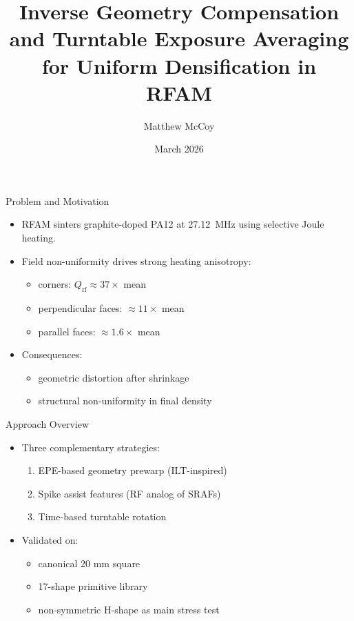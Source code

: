 \documentclass[aspectratio=169,10pt]{beamer}
\title{Inverse Geometry Compensation and Turntable Exposure Averaging for Uniform Densification in RFAM}
\author{Matthew McCoy}
\institute{Georgia Institute of Technology}
\date{March 2026}
\newcommand{\Qrf}{Q_{\mathrm{rf}}}
\begin{document}
\begin{frame}
  \titlepage
\end{frame}

\begin{frame}{Problem and Motivation}
  \begin{itemize}
    \item RFAM sinters graphite-doped PA12 at \SI{27.12}{\mega\hertz} using selective Joule heating.
    \item Field non-uniformity drives strong heating anisotropy:
    \begin{itemize}
      \item corners: $\Qrf \approx 37\times$ mean
      \item perpendicular faces: $\approx 11\times$ mean
      \item parallel faces: $\approx 1.6\times$ mean
    \end{itemize}
    \item Consequences:
    \begin{itemize}
      \item geometric distortion after shrinkage
      \item structural non-uniformity in final density
    \end{itemize}
  \end{itemize}
\end{frame}

\begin{frame}{Approach Overview}
  \begin{itemize}
    \item Three complementary strategies:
    \begin{enumerate}
      \item EPE-based geometry prewarp (ILT-inspired)
      \item Spike assist features (RF analog of SRAFs)
      \item Time-based turntable rotation
    \end{enumerate}
    \item Validated on:
    \begin{itemize}
      \item canonical 20 mm square
      \item 17-shape primitive library
      \item non-symmetric H-shape as main stress test
    \end{itemize}
  \end{itemize}
\end{frame}
\end{document}
